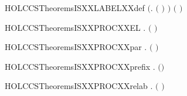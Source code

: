 \newcommand{\HOLCCSTheoremsFVXXSUM}{\UseVerbatim{HOLCCSTheoremsFVXXSUM}}
\begin{SaveVerbatim}{HOLCCSTheoremsISXXLABELXXdef}
\HOLTokenTurnstile{} \ensuremath{(}\HOLSymConst{\HOLTokenForall{}}.  \ensuremath{(} \ensuremath{)} \HOLSymConst{\HOLTokenEquiv{}} \ensuremath{)} \HOLSymConst{\HOLTokenConj{}} \ensuremath{(} \HOLConst{\ensuremath{\tau}} \HOLSymConst{\HOLTokenEquiv{}} \ensuremath{)}
\end{SaveVerbatim}
\newcommand{\HOLCCSTheoremsISXXLABELXXdef}{\UseVerbatim{HOLCCSTheoremsISXXLABELXXdef}}
\begin{SaveVerbatim}{HOLCCSTheoremsISXXPROCXXEL}
\HOLTokenTurnstile{} \HOLSymConst{\HOLTokenForall{}} .   \HOLSymConst{\HOLTokenConj{}}  \HOLSymConst{\HOLTokenLt{}}   \HOLSymConst{\HOLTokenImp{}}  \ensuremath{(}  \ensuremath{)}
\end{SaveVerbatim}
\newcommand{\HOLCCSTheoremsISXXPROCXXEL}{\UseVerbatim{HOLCCSTheoremsISXXPROCXXEL}}
\begin{SaveVerbatim}{HOLCCSTheoremsISXXPROCXXpar}
\HOLTokenTurnstile{} \HOLSymConst{\HOLTokenForall{}} .  \ensuremath{(} \HOLSymConst{\ensuremath{\mid}} \ensuremath{)} \HOLSymConst{\HOLTokenEquiv{}}   \HOLSymConst{\HOLTokenConj{}}  
\end{SaveVerbatim}
\newcommand{\HOLCCSTheoremsISXXPROCXXpar}{\UseVerbatim{HOLCCSTheoremsISXXPROCXXpar}}
\begin{SaveVerbatim}{HOLCCSTheoremsISXXPROCXXprefix}
\HOLTokenTurnstile{} \HOLSymConst{\HOLTokenForall{}} .  \ensuremath{(}\HOLSymConst{\ensuremath{\ldotp}}\ensuremath{)} \HOLSymConst{\HOLTokenEquiv{}}  
\end{SaveVerbatim}
\newcommand{\HOLCCSTheoremsISXXPROCXXprefix}{\UseVerbatim{HOLCCSTheoremsISXXPROCXXprefix}}
\begin{SaveVerbatim}{HOLCCSTheoremsISXXPROCXXrelab}
\HOLTokenTurnstile{} \HOLSymConst{\HOLTokenForall{}} .  \ensuremath{(}  \ensuremath{)} \HOLSymConst{\HOLTokenEquiv{}}  
\end{SaveVerbatim}
